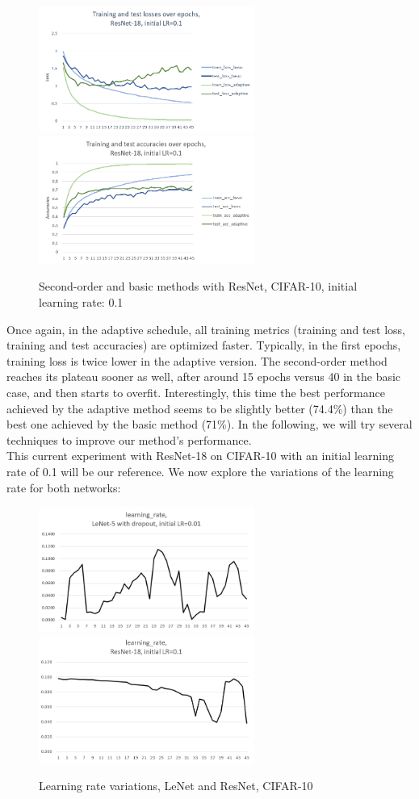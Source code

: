 \documentclass{article}
\begin{document}
  \begin{figure}[!h]
	\includegraphics[width=200pt]{loss_resnet_0_1.png}
	\includegraphics[width=200pt]{acc_resnet_0_1.png}
	\caption{Second-order and basic methods with ResNet, CIFAR-10, initial learning rate: 0.1}
  \end{figure}
  
  Once again, in the adaptive schedule, all training metrics (training and test loss, training and test accuracies) are optimized faster. Typically, in the first epochs, training loss is twice lower in the adaptive version. The second-order method reaches its plateau sooner as well, after around 15 epochs versus 40 in the basic case, and then starts to overfit. Interestingly, this time the best performance achieved by the adaptive method seems to be slightly better (74.4\%) than the best one achieved by the basic method (71\%). In the following, we will try several techniques to improve our method's performance. \\
  This current experiment with ResNet-18 on CIFAR-10 with an initial learning rate of 0.1 will be our reference. We now explore the variations of the learning rate for both networks:
  
  \begin{figure}[!h]
	\includegraphics[width=200pt]{lr_lenet_d_0_01.png}
	\includegraphics[width=200pt]{lr_resnet_0_1.png}
	\caption{Learning rate variations, LeNet and ResNet, CIFAR-10}
  \end{figure}
  
\end{document}
